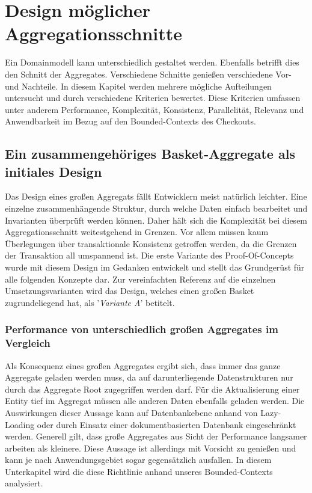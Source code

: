 \chapter{Design möglicher Aggregationsschnitte }

Ein Domainmodell kann unterschiedlich gestaltet werden. Ebenfalls betrifft dies den Schnitt der Aggregates. Verschiedene Schnitte genießen verschiedene Vor- und Nachteile. In diesem Kapitel werden mehrere mögliche Aufteilungen untersucht und durch verschiedene Kriterien bewertet. Diese Kriterien umfassen unter anderem Performance, Komplexität, Konsistenz, Parallelität, Relevanz und Anwendbarkeit im Bezug auf den Bounded-Contexts des Checkouts.

\section{Ein zusammengehöriges Basket-Aggregate als initiales Design}

Das Design eines großen Aggregats fällt Entwicklern meist natürlich leichter. Eine einzelne zusammenhängende Struktur, durch welche Daten einfach bearbeitet und Invarianten überprüft werden können. Daher hält sich die Komplexität bei diesem Aggregationsschnitt weitestgehend in Grenzen. Vor allem müssen kaum Überlegungen über transaktionale Konsistenz getroffen werden, da die Grenzen der Transaktion all umspannend ist. Die erste Variante des Proof-Of-Concepts wurde mit diesem Design im Gedanken entwickelt und stellt das Grundgerüst für alle folgenden Konzepte dar. Zur vereinfachten Referenz auf die einzelnen Umsetzungsvarianten wird das Design, welches einen großen Basket zugrundeliegend hat, als '\emph{Variante A}' betitelt.


\subsection{Performance von unterschiedlich großen Aggregates im Vergleich}

Als Konsequenz eines großen Aggregates ergibt sich, dass immer das ganze Aggregate geladen werden muss, da auf darunterliegende Datenstrukturen nur durch das Aggregate Root zugegriffen werden darf. Für die Aktualisierung einer Entity tief im Aggregat müssen alle anderen Daten ebenfalls geladen werden. Die Auswirkungen dieser Aussage kann auf Datenbankebene anhand von Lazy-Loading oder durch Einsatz einer dokumentbasierten Datenbank eingeschränkt werden. Generell gilt, dass große Aggregates aus Sicht der Performance langsamer arbeiten als kleinere. Diese Aussage ist allerdings mit Vorsicht zu genießen und kann je nach Anwendungsgebiet sogar gegensätzlich ausfallen. In diesem Unterkapitel wird die diese Richtlinie anhand unseres Bounded-Contexts analysiert.

